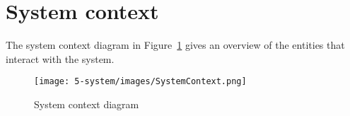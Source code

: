 \section{System context}
\label{sec:system-context}

The system context diagram in Figure~\ref{fig:system-context-diagram} gives an overview of the entities that interact with the system.

\begin{figure}[H]
	\centering
	\texttt{[image: 5-system/images/SystemContext.png]}
	\caption{System context diagram}
	\label{fig:system-context-diagram}
\end{figure}
